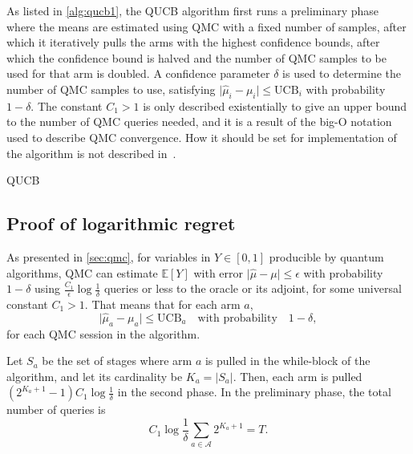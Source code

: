 As listed in \cref{alg:qucb1}, the QUCB algorithm first runs a preliminary phase where the means are estimated using QMC with a fixed number of samples, after which it iteratively pulls the arms with the highest confidence bounds, after which the confidence bound is halved and the number of QMC samples to be used for that arm is doubled.
A confidence parameter $\delta$ is used to determine the number of QMC samples to use, satisfying $\lvert\hat{\mu}_i - \mu_i\rvert \leq \text{UCB}_i$ with probability $1-\delta$.
The constant $C_1>1$ is only described existentially to give an upper bound to the number of QMC queries needed, and it is a result of the big-O notation used to describe QMC convergence.
How it should be set for implementation of the algorithm is not described in~\autocite{wan2022}.


\begin{algorithm}
    \SetAlgoLined
    \caption{QUCB}
    \label{alg:qucb1}
\end{algorithm}

\subsection{Proof of logarithmic regret}
\label{sec:wan_proof}
As presented in \cref{sec:qmc}, for variables in $Y \in [0, 1]$ producible by quantum algorithms, QMC can estimate $\mathbb{E}[Y]$ with error $\lvert\hat{\mu} - \mu\rvert \leq \epsilon$ with probability $1-\delta$ using $\frac{C_1}{\epsilon} \log \frac{1}{\delta}$ queries or less to the oracle or its adjoint, for some universal constant $C_1>1$.
That means that for each arm $a$,
\begin{equation}
    \lvert\hat{\mu}_a - \mu_a\rvert \leq \text{UCB}_a
    \quad \text{with probability} \quad
    1 - \delta,
    \label{eq:wan_qmc}
\end{equation}
for each QMC session in the algorithm.

Let $S_a$ be the set of stages where arm $a$ is pulled in the while-block of the algorithm, and let its cardinality be $K_a = |S_a|$.
Then, each arm is pulled $(2^{K_a + 1} - 1)C_1 \log \frac1\delta$ in the second phase.
In the preliminary phase, the total number of queries is
\begin{equation}
    C_1 \log \frac{1}{\delta} \sum_{a \in \mathcal{A}} 2^{K_a + 1} = T.
\end{equation}

